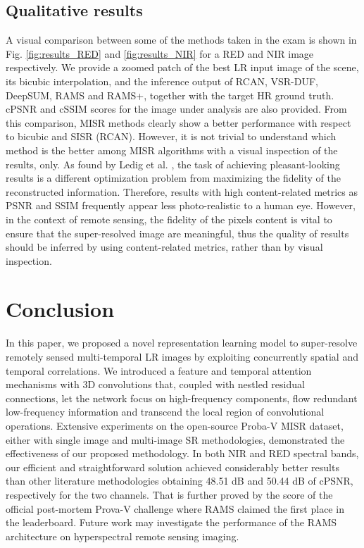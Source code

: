 \documentclass[journal]{IEEEtran}
\begin{document}
\subsection{Qualitative results}
A visual comparison between some of the methods taken in the exam is shown in Fig. \ref{fig:results_RED} and \ref{fig:results_NIR} for a RED and NIR image respectively. We provide a zoomed patch of the best LR input image of the scene, its bicubic interpolation, and the inference output of RCAN, VSR-DUF, DeepSUM, RAMS and RAMS+, together with the target HR ground truth. cPSNR and cSSIM scores for the image under analysis are also provided. From this comparison, MISR methods clearly show a better performance with respect to bicubic and SISR (RCAN). However, it is not trivial to understand which method is the better among MISR algorithms with a visual inspection of the results, only. As found by Ledig et al. \cite{ledig2017photo}, the task of achieving pleasant-looking results is a different optimization problem from maximizing the fidelity of the reconstructed information. Therefore, results with high content-related metrics as PSNR and SSIM frequently appear less photo-realistic to a human eye. However, in the context of remote sensing, the fidelity of the pixels content is vital to ensure that the super-resolved image are meaningful, thus the quality of results should be inferred by using content-related metrics, rather than by visual inspection.





\section{Conclusion} \label{conclusion}
In this paper, we proposed a novel representation learning model to super-resolve remotely sensed multi-temporal LR images by exploiting concurrently spatial and temporal correlations. We introduced a feature and temporal attention mechanisms with 3D convolutions that, coupled with nestled residual connections, let the network focus on high-frequency components, flow redundant low-frequency information and transcend the local region of convolutional operations. Extensive experiments on the open-source Proba-V MISR dataset, either with single image and multi-image SR methodologies, demonstrated the effectiveness of our proposed methodology. In both NIR and RED spectral bands, our efficient and straightforward solution achieved considerably better results than other literature methodologies obtaining 48.51 dB and 50.44 dB of cPSNR, respectively for the two channels. That is further proved by the score of the official post-mortem Prova-V challenge where RAMS claimed the first place in the leaderboard. Future work may investigate the performance of the RAMS architecture on hyperspectral remote sensing imaging.
\end{document}
